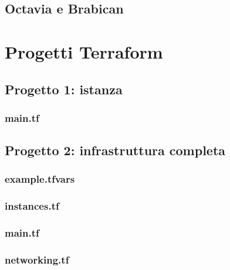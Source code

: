 

\section{Octavia e Brabican}\label{app:barbican_octavia_overlay}



\chapter{Progetti Terraform}

\section{Progetto 1: istanza}\label{app:tf_proj1}

\subsection{main.tf}


\section{Progetto 2: infrastruttura completa}\label{app:tf_proj2}

\subsection{example.tfvars}

\subsection{instances.tf}

\subsection{main.tf}

\subsection{networking.tf}



